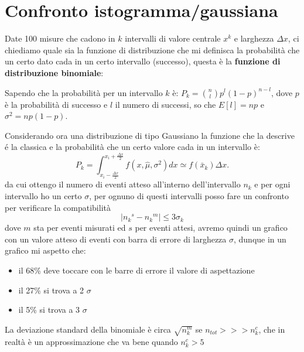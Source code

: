 \documentclass{article}
\theoremstyle{remark}
\begin{document}
\section{Confronto istogramma/gaussiana}
Date 100 misure che cadono in $k$ intervalli di valore centrale $x^k$ e larghezza $\Delta x$, ci chiediamo quale sia la funzione di distribuzione che mi definisca la probabilità che un certo dato cada in un
certo intervallo (successo), questa è la \textbf{funzione di distribuzione binomiale}:

Sapendo che la probabilità per un intervallo $k$ è: $P_k= \binom{n}{l}p^l(1-p)^{n-l}$, dove $p$ è la probabilità di successo e $l$ il numero di successi, so che $E[l]=np$ e  $\sigma^2= np(1-p)$.

Considerando ora una distribuzione di tipo Gaussiano la funzione che la descrive é la classica e la probabilità che un certo valore cada in un intervallo è:
\[
P_k=\int_{x_i -\frac{\Delta x}{2}}^{x_i + \frac{\Delta x}{2}} f(x, \hat{\mu}, \sigma^2) dx \simeq f(\bar{x}_k) \Delta x. 
\]
da cui ottengo il numero di eventi atteso all'interno dell'intervallo $n_k$ e per ogni intervallo ho un certo $\sigma$, per ognuno di questi intervalli posso fare un confronto per verificare la compatibilità
\begin{equation*}
\left| {n_k}^s-{n_k}^m \right| \leq 3 \sigma_k
\end{equation*}
dove $m$ sta per eventi misurati ed $s$ per eventi attesi, avremo quindi un grafico con un valore atteso di eventi con barra di errore di larghezza $\sigma$, dunque in un grafico mi aspetto che:
\begin{itemize}
\item il 68\% deve toccare con le barre di errore il valore di aspettazione
\item il 27\% si trova a 2 $\sigma$
\item il 5\% si trova a 3 $\sigma$
\end{itemize}
La deviazione standard della binomiale è circa $\sqrt{n_k^m}$ se $n_{tot}>>>n_k^c$, che in realtà è un approssimazione che va bene quando $n_k^c > 5$


\pagebreak
\end{document}

